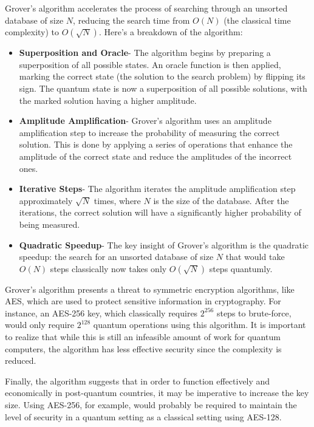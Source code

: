 \documentclass[conference]{IEEEtran}
\begin{document}
Grover's algorithm accelerates the process of searching through an unsorted database of size \( N \), reducing the search time from \( O(N) \) (the classical time complexity) to \( O(\sqrt{N}) \). Here’s a breakdown of the algorithm:

\begin{itemize}
\item \textbf{Superposition and Oracle}- The algorithm begins by preparing a superposition of all possible states. An oracle function is then applied, marking the correct state (the solution to the search problem) by flipping its sign. The quantum state is now a superposition of all possible solutions, with the marked solution having a higher amplitude.

\item \textbf{Amplitude Amplification}- Grover’s algorithm uses an amplitude amplification step to increase the probability of measuring the correct solution. This is done by applying a series of operations that enhance the amplitude of the correct state and reduce the amplitudes of the incorrect ones.

\item \textbf{Iterative Steps}- The algorithm iterates the amplitude amplification step approximately \( \sqrt{N} \) times, where \( N \) is the size of the database. After the iterations, the correct solution will have a significantly higher probability of being measured.

\item \textbf{Quadratic Speedup}- The key insight of Grover’s algorithm is the quadratic speedup: the search for an unsorted database of size \( N \) that would take \( O(N) \) steps classically now takes only \( O(\sqrt{N}) \) steps quantumly.
\end{itemize}
Grover's algorithm presents a threat to symmetric encryption algorithms, like AES, which are used to protect sensitive information in cryptography. For instance, an AES-256 key, which classically requires \( 2^{256} \) steps to brute-force, would only require \( 2^{128} \) quantum operations using this algorithm. It is important to realize that while this is still an infeasible amount of work for quantum computers, the algorithm has less effective security since the complexity is reduced.

Finally, the algorithm suggests that in order to function effectively and economically in post-quantum countries, it may be imperative to increase the key size. Using AES-256, for example, would probably be required to maintain the level of security in a quantum setting as a  classical setting using AES-128.
\end{document}
